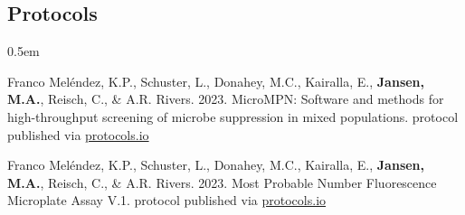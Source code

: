 \documentclass[12pt,a4paper]{article}
\begin{document}
\subsection*{Protocols}
\begin{description}
	\itemsep0.5em
	\item Franco Mel\'{e}ndez, K.P., Schuster, L., Donahey, M.C., Kairalla, E., \textbf{Jansen, M.A.}, Reisch, C., \& A.R. Rivers. 2023. MicroMPN: Software and methods for high-throughput screening of microbe suppression in mixed populations. protocol published via \href{dx.doi.org/10.17504/protocols.io.81wgbymenvpk/v1}{protocols.io}
	\item Franco Mel\'{e}ndez, K.P., Schuster, L., Donahey, M.C., Kairalla, E., \textbf{Jansen, M.A.}, Reisch, C., \& A.R. Rivers. 2023. Most Probable Number Fluorescence Microplate Assay V.1. protocol published via \href{dx.doi.org/10.17504/protocols.io.q26g7yqk1gwz/v1}{protocols.io}
\end{description}
\end{document}
